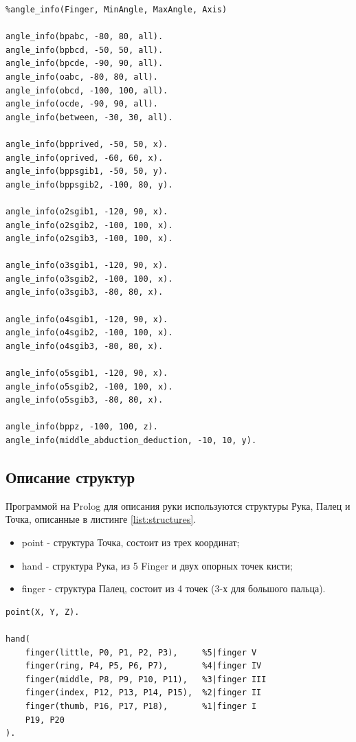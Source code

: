 \begin{lstlisting}[caption=Знания об амплитудах углов и проверяемых осях, label=list:angle_info]
%info about angle limits in degrees for fingers and axis
%angle_info(Finger, MinAngle, MaxAngle, Axis)

angle_info(bpabc, -80, 80, all).
angle_info(bpbcd, -50, 50, all).
angle_info(bpcde, -90, 90, all).
angle_info(oabc, -80, 80, all).
angle_info(obcd, -100, 100, all).
angle_info(ocde, -90, 90, all).
angle_info(between, -30, 30, all).

angle_info(bpprived, -50, 50, x).
angle_info(oprived, -60, 60, x).
angle_info(bppsgib1, -50, 50, y).
angle_info(bppsgib2, -100, 80, y).

angle_info(o2sgib1, -120, 90, x).
angle_info(o2sgib2, -100, 100, x).
angle_info(o2sgib3, -100, 100, x).

angle_info(o3sgib1, -120, 90, x).
angle_info(o3sgib2, -100, 100, x).
angle_info(o3sgib3, -80, 80, x).

angle_info(o4sgib1, -120, 90, x).
angle_info(o4sgib2, -100, 100, x).
angle_info(o4sgib3, -80, 80, x).

angle_info(o5sgib1, -120, 90, x).
angle_info(o5sgib2, -100, 100, x).
angle_info(o5sgib3, -80, 80, x).

angle_info(bppz, -100, 100, z).
angle_info(middle_abduction_deduction, -10, 10, y).
\end{lstlisting}

\subsection{Описание структур}
\hspace{0.6cm} Программой на Prolog для описания руки используются структуры Рука, Палец и Точка, описанные в листинге \ref{list:structures}.

\begin{itemize}
	\item point - структура Точка, состоит из трех координат;
	\item hand - структура Рука, из 5 Finger и двух опорных точек кисти;
	\item finger - структура Палец, состоит из 4 точек (3-х для большого пальца).
\end{itemize}
\begin{lstlisting}[caption=Структуры, label=list:structures]
point(X, Y, Z).

hand(
	finger(little, P0, P1, P2, P3),		%5|finger V
	finger(ring, P4, P5, P6, P7),		%4|finger IV
	finger(middle, P8, P9, P10, P11),	%3|finger III
	finger(index, P12, P13, P14, P15),	%2|finger II
	finger(thumb, P16, P17, P18),		%1|finger I
	P19, P20							
).	
\end{lstlisting}

